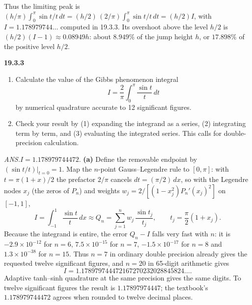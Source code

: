 Thus the limiting peak is
$(h/\pi)\int_0^\pi\sin t/t\,dt=(h/2)\,(2/\pi)\int_0^\pi\sin t/t\,dt
=(h/2)I$, with $I=1.178979744\ldots$ computed in 19.3.3. Its overshoot
above the level $h/2$ is $(h/2)(I-1)\approx0.08949h$: about $8.949\%$
of the jump height $h$, or $17.898\%$ of the positive level $h/2$.

\par\bigskip
\noindent\textbf{19.3.3}
\begin{enumerate}
\item[(a)] Calculate the value of the Gibbs phenomenon integral
\[
I=\frac{2}{\pi}\int_{0}^{\pi}\frac{\sin t}{t}\,dt
\]
by numerical quadrature accurate to 12 significant figures.
\item[(b)] Check your result by (1) expanding the integrand as a
series, (2) integrating term by term, and (3) evaluating the
integrated series. This calls for double-precision calculation.
\end{enumerate}
\par\nobreak\hfill\emph{ANS.}\enspace$I=1.178979744472$.
\solution
\textbf{(a)} Define the removable endpoint by $(\sin t/t)|_{t=0}=1$.
Map the $n$-point Gauss--Legendre rule to $[0,\pi]$: with $t=\pi(1+x)/2$
the prefactor $2/\pi$ cancels $dt=(\pi/2)\,dx$, so with the Legendre
nodes $x_j$ (the zeros of $P_n$) and weights
$w_j=2/[(1-x_j^2)P_n'(x_j)^2]$ on $[-1,1]$,
\[
I=\int_{-1}^{1}\frac{\sin t}{t}\,dx
\approx Q_n=\sum_{j=1}^nw_j\,\frac{\sin t_j}{t_j},
\qquad t_j=\frac\pi2(1+x_j).
\]
Because the integrand is entire, the error $Q_n-I$ falls very fast
with $n$:
it is $-2.9\times10^{-12}$ for $n=6$, $7.5\times10^{-15}$ for $n=7$,
$-1.5\times10^{-17}$ for $n=8$ and $1.3\times10^{-38}$ for $n=15$.
Thus $n=7$ in ordinary double precision already gives the requested
twelve significant figures, and $n=20$ in 65-digit arithmetic gives
\[
\boxed{I=1.178979744472167270232028845824\ldots.}
\]
Adaptive tanh--sinh quadrature at the same precision gives the same
digits. To twelve significant figures the result is
$\boxed{1.17897974447}$; the textbook's $1.178979744472$ agrees when
rounded to twelve decimal places.

